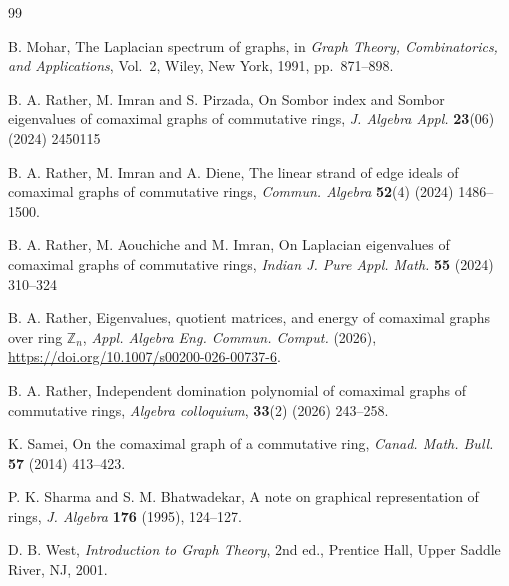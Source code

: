 \documentclass[12pt]{article}
\theoremstyle{definition}
\begin{document}
\begin{thebibliography}{99}
		
		
		B. Mohar, The Laplacian spectrum of graphs, in \emph{Graph Theory, Combinatorics, and Applications}, Vol.~2, Wiley, New York, 1991, pp.~871--898.
		
		 B. A. Rather, M. Imran and S. Pirzada, On Sombor index and Sombor eigenvalues of comaximal graphs of commutative rings, \emph{J. Algebra  Appl.} \textbf{23}(06) (2024) 2450115
		
		 B. A. Rather, M. Imran and A. Diene, The linear strand of edge ideals of comaximal graphs of commutative rings, \emph{Commun. Algebra} \textbf{52}(4) (2024) 1486--1500.
		
		 B. A. Rather, M. Aouchiche and M. Imran, On Laplacian eigenvalues of comaximal graphs of commutative rings, \emph{Indian J. Pure  Appl. Math.} \textbf{55} (2024) 310--324
		
		  B. A. Rather, Eigenvalues, quotient matrices, and energy of comaximal graphs over ring $\mathbb{Z}_{n}$, \textit{Appl. Algebra  Eng. Commun. Comput.} (2026), \url{https://doi.org/10.1007/s00200-026-00737-6}.
		
		 B. A. Rather, Independent domination polynomial of comaximal graphs of commutative rings, \emph{Algebra colloquium}, \textbf{33}(2) (2026) 243--258.
		
		
		K. Samei, On the comaximal graph of a commutative ring, \emph{Canad. Math. Bull.} \textbf{57} (2014) 413--423.
		
		
		P. K. Sharma and S. M. Bhatwadekar, A note on graphical representation of rings, \emph{J. Algebra} \textbf{176} (1995), 124--127.
		
		D. B. West, \emph{Introduction to Graph Theory}, 2nd ed., Prentice Hall, Upper Saddle River, NJ, 2001.
		
	\end{thebibliography}
	
\end{document}

